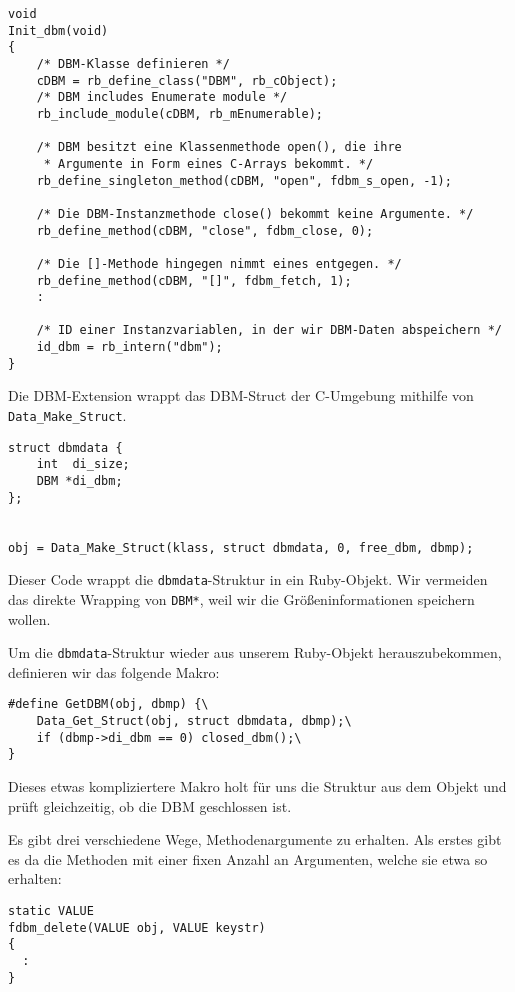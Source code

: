 \begin{lstlisting}
void
Init_dbm(void)
{
    /* DBM-Klasse definieren */
    cDBM = rb_define_class("DBM", rb_cObject);
    /* DBM includes Enumerate module */
    rb_include_module(cDBM, rb_mEnumerable);

    /* DBM besitzt eine Klassenmethode open(), die ihre
     * Argumente in Form eines C-Arrays bekommt. */
    rb_define_singleton_method(cDBM, "open", fdbm_s_open, -1);

    /* Die DBM-Instanzmethode close() bekommt keine Argumente. */
    rb_define_method(cDBM, "close", fdbm_close, 0);

    /* Die []-Methode hingegen nimmt eines entgegen. */
    rb_define_method(cDBM, "[]", fdbm_fetch, 1);
    :

    /* ID einer Instanzvariablen, in der wir DBM-Daten abspeichern */
    id_dbm = rb_intern("dbm");
}
\end{lstlisting}

Die DBM-Extension wrappt das DBM-Struct der C-Umgebung mithilfe von
\verb+Data_Make_Struct+.

\begin{lstlisting}
struct dbmdata {
    int  di_size;
    DBM *di_dbm;
};


obj = Data_Make_Struct(klass, struct dbmdata, 0, free_dbm, dbmp);
\end{lstlisting}

Dieser Code wrappt die \verb+dbmdata+-Struk\-tur in ein Ruby-Objekt. Wir
vermeiden das direkte Wrapping von \verb+DBM*+, weil wir die
Größeninformationen speichern wollen.

Um die \verb+dbmdata+-Struktur wieder aus unserem Ruby-Objekt
herauszubekommen, definieren wir das folgende Makro:

\begin{lstlisting}
#define GetDBM(obj, dbmp) {\
    Data_Get_Struct(obj, struct dbmdata, dbmp);\
    if (dbmp->di_dbm == 0) closed_dbm();\
}
\end{lstlisting}

Dieses etwas kompliziertere Makro holt für uns die Struktur aus dem
Objekt und prüft gleichzeitig, ob die DBM geschlossen ist.

Es gibt drei verschiedene Wege, Methodenargumente zu erhalten. Als
erstes gibt es da die Methoden mit einer fixen Anzahl an Argumenten,
welche sie etwa so erhalten:

\begin{lstlisting}
static VALUE
fdbm_delete(VALUE obj, VALUE keystr)
{
  :
}
\end{lstlisting}

